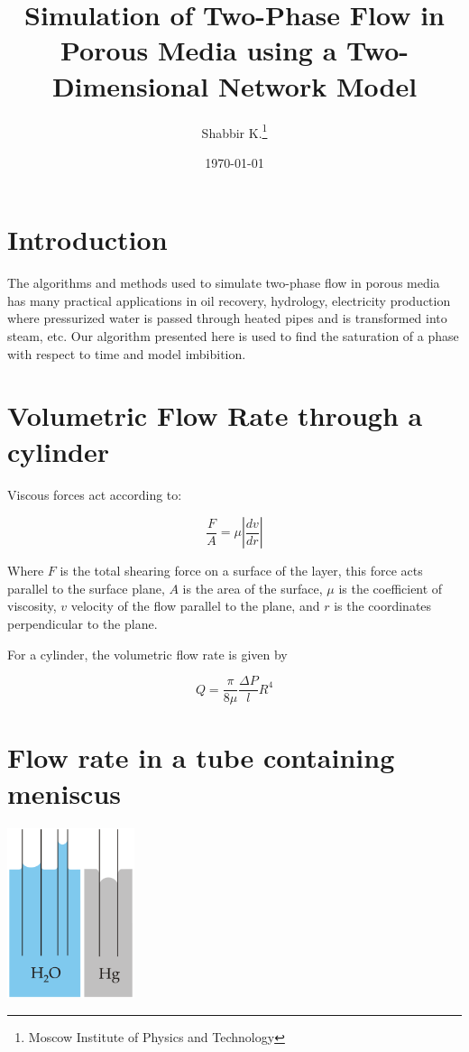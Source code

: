 \documentclass[12pt]{article}
\title{Simulation of Two-Phase Flow in Porous Media using a Two-Dimensional Network Model}
\author{Shabbir K.\thanks{Moscow Institute of Physics and Technology}}
\date{\today}
\begin{document}
\maketitle

\section{Introduction}
The algorithms and methods used to simulate two-phase flow in porous media has many practical applications in oil recovery, hydrology, electricity production where pressurized water is passed through heated pipes and is transformed into steam, etc. Our algorithm presented here is used to find the saturation of a phase with respect to time and model imbibition.

\section{Volumetric Flow Rate through a cylinder}

	Viscous forces act according to:

	\[ \frac{F}{A} = \mu \left| \frac{dv}{dr} \right| \]

	Where $F$ is the total shearing force on a surface of the layer, this force acts parallel to the surface plane, $A$ is the area of the surface, $\mu$ is the coefficient of viscosity, $v$ velocity of the flow parallel to the plane, and $r$ is the coordinates perpendicular to the plane.

	For a cylinder, the volumetric flow rate is given by

	\begin{equation} \label{eq:flow-rate}
	\boxed{Q = \frac{\pi}{8\mu}\frac{\Delta P}{l} R^4}
	\end{equation}


\section{Flow rate in a tube containing meniscus}

	\includegraphics[height=5cm]{fig_capact-of-water} \label{fig_capact-of-water}
\end{document}
